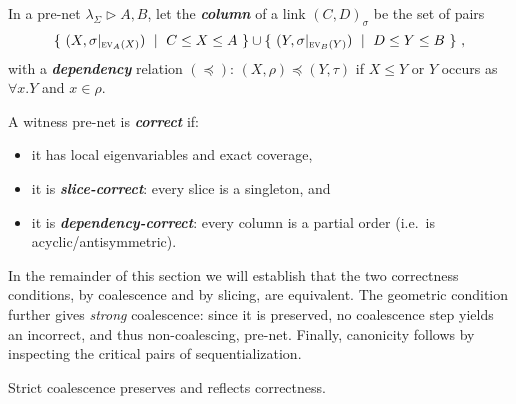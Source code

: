 \documentclass[twoside,a4paper]{article}
\newcommand\defn[1]{\textit{\textbf{#1}}}
\newcommand\ex[2][{}]{\textsc{ev}_{#1}(#2)}
\newcommand\+{+}
\renewcommand\*{\times}
\newcommand\sub{\leq}
\newcommand\dep{\preccurlyeq}
\newcommand\net[3]{#1\triangleright #2,#3}
\newcommand\res[1]{|_{#1}}
\newcommand\link[3][\sigma]{(#2,#3)_{#1}}
\begin{document}
\begin{definition}
In a pre-net $\net{\lambda_\Sigma}AB$, let the \defn{column} of a link $\link CD$ be the set of pairs 
\[
	\{~(X,\sigma\res{\ex[A]X})~\mid~C\sub X\sub A~\}\cup\{~(Y,\sigma\res{\ex[B]Y})~\mid~D\sub Y\sub B~\}~,
\]
with a \defn{dependency} relation $(\dep)$: $(X,\rho)\dep(Y,\tau)$ if $X\leq Y$ or $Y$ occurs as $\forall x.Y$ and $x\in\rho$.
\end{definition}

\begin{definition}
A witness pre-net is \defn{correct} if:
\begin{itemize}
\item it has local eigenvariables and exact coverage,
\item it is \defn{slice-correct}: every slice is a singleton, and
\item it is \defn{dependency-correct}: every column is a partial order (i.e.\ is acyclic/antisymmetric).
\end{itemize}
\end{definition}

In the remainder of this section we will establish that the two correctness conditions, by coalescence and by slicing, are equivalent. The geometric condition further gives \emph{strong} coalescence: since it is preserved, no coalescence step yields an incorrect, and thus non-coalescing, pre-net. Finally, canonicity follows by inspecting the critical pairs of sequentialization.


\begin{lemma}
\label{lem:correct}
Strict coalescence preserves and reflects correctness.
\end{lemma}
\end{document}
